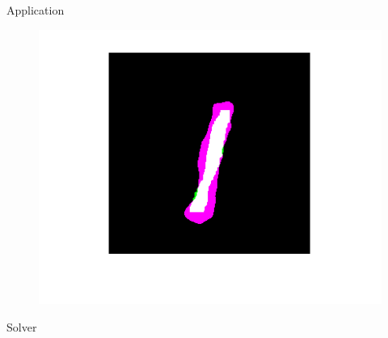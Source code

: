 \documentclass[aspectratio=169,xcolor=dvipsnames]{beamer}
\begin{document}
\begin{frame}[fragile]{Application}
\begin{figure}
\begin{minipage}{0.25\linewidth}
	\includegraphics[width=\linewidth]{GT_vs_SEG.png}
\end{minipage}\hfill
	\end{figure}
\end{frame}

\begin{frame}{Solver}
\begin{figure}
	\centering
	\begin{minipage}{\linewidth}
		\centering
		\fontsize{3}{4}
	\end{minipage}
\end{figure}	
	
\end{frame}
\end{document}
